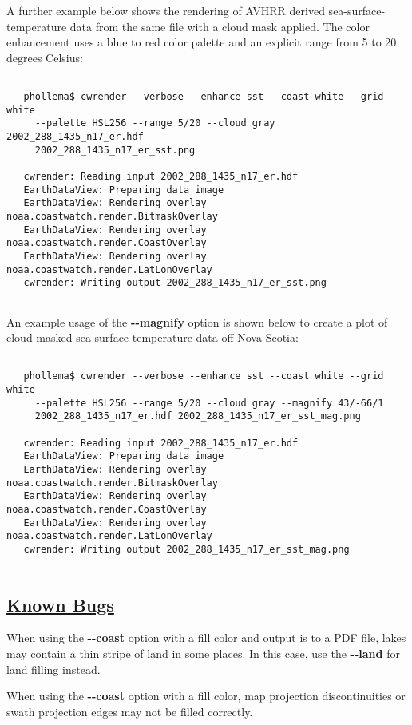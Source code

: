  A further example below shows the rendering of AVHRR derived sea-surface-temperature data from the same file with a cloud mask applied. The color enhancement uses a blue to red color palette and an explicit range from 5 to 20 degrees Celsius:
\begin{verbatim}

   phollema$ cwrender --verbose --enhance sst --coast white --grid white 
     --palette HSL256 --range 5/20 --cloud gray 2002_288_1435_n17_er.hdf
     2002_288_1435_n17_er_sst.png

   cwrender: Reading input 2002_288_1435_n17_er.hdf
   EarthDataView: Preparing data image
   EarthDataView: Rendering overlay noaa.coastwatch.render.BitmaskOverlay
   EarthDataView: Rendering overlay noaa.coastwatch.render.CoastOverlay
   EarthDataView: Rendering overlay noaa.coastwatch.render.LatLonOverlay
   cwrender: Writing output 2002_288_1435_n17_er_sst.png
 
\end{verbatim}


 An example usage of the \textbf{-{-}magnify}
 option is shown below to create a plot of cloud masked sea-surface-temperature data off Nova Scotia:
\begin{verbatim}

   phollema$ cwrender --verbose --enhance sst --coast white --grid white 
     --palette HSL256 --range 5/20 --cloud gray --magnify 43/-66/1
     2002_288_1435_n17_er.hdf 2002_288_1435_n17_er_sst_mag.png

   cwrender: Reading input 2002_288_1435_n17_er.hdf
   EarthDataView: Preparing data image
   EarthDataView: Rendering overlay noaa.coastwatch.render.BitmaskOverlay
   EarthDataView: Rendering overlay noaa.coastwatch.render.CoastOverlay
   EarthDataView: Rendering overlay noaa.coastwatch.render.LatLonOverlay
   cwrender: Writing output 2002_288_1435_n17_er_sst_mag.png
 
\end{verbatim}
\subsection*{\underline{Known Bugs}}


 When using the \textbf{-{-}coast}
 option with a fill color and output is to a PDF file, lakes may contain a thin stripe of land in some places. In this case, use the \textbf{-{-}land}
 for land filling instead.


 When using the \textbf{-{-}coast}
 option with a fill color, map projection discontinuities or swath projection edges may not be filled correctly.

